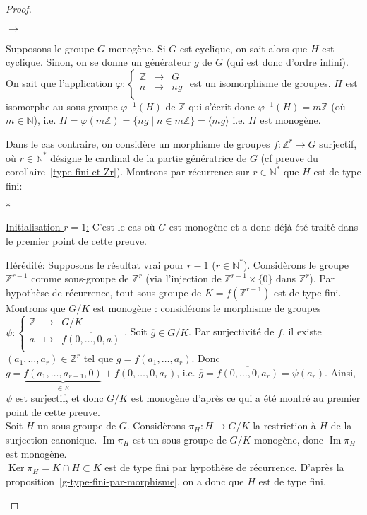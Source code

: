 \documentclass{article}
\newcommand{\Z}{\mathbb{Z}}
\newcommand{\N}{\mathbb{N}}
\newcommand{\im}{\mathop{\mathrm{Im}}\nolimits}
\renewcommand{\ker}{\mathop{\mathrm{Ker}}\nolimits}
\newenvironment{ls}{\begin{list}{$\to$}{}}{\end{list}}
\newenvironment{lls}{\begin{list}{$\ast$}{}}{\end{list}}
\theoremstyle{definition}
\theoremstyle{remark}
\newcommand{\app}[5]{#1:\left\{\begin{array}{rcl}
#2 & \longrightarrow & #3 \\
#4 & \longmapsto & #5  \\
\end{array}\right.
}
\begin{document}
\begin{proof}
\begin{ls}
\item Supposons le groupe $G$ monogène. Si $G$ est cyclique, on sait alors que $H$ est cyclique. Sinon, on se donne un générateur $g$ de $G$ (qui est donc d'ordre infini). On sait que l'application $\app{\varphi}{\Z}{G}{n}{ng}$ est un isomorphisme de groupes. $H$ est isomorphe au sous-groupe $\varphi^{-1}(H)$ de $\Z$ qui s'écrit donc $\varphi^{-1}(H)=m\Z$ (où $m \in \N$), i.e. $H=\varphi(m\Z)=\{ng \mid n \in m\Z \}=\langle mg\rangle$ i.e. $H$ est monogène. 
\item Dans le cas contraire, on considère un morphisme de groupes $f:\Z^r\to G$ surjectif, où $r \in \N^*$ désigne le cardinal de la partie génératrice de $G$ (cf preuve du corollaire~\ref{type-fini-et-Zr}). Montrons par récurrence sur $r \in \N^*$ que $H$ est de type fini:
\begin{lls}
	\item\underline{Initialisation $r=1$:} C'est le cas o\`u $G$ est monog\`ene et a donc d\'ej\`a été traité dans le premier point de cette preuve.
	\item\underline{H\'er\'edit\'e:} Supposons le résultat vrai pour $r-1$ ($r \in \N^*$). Considèrons le groupe $\Z^{r-1}$ comme sous-groupe de $\Z^r$ (via l'injection de $\Z^{r-1} \times \{0\}$ dans $\Z^{r}$). Par hypothèse de récurrence, tout sous-groupe de $K=f(\Z^{r-1})$ est de type fini. Montrons que $G/K$ est monogène : considérons le morphisme de groupes $\app{\psi}{\Z}{G/K}{a}{\overline{f(0, \ldots, 0,a)}}$. 
Soit $\overline{g} \in G/K$. Par surjectivité de $f$, il existe $(a_1, \ldots, a_r) \in \Z^r$ tel que $g=f(a_1, \ldots, a_r)$. Donc $g=\underbrace{f(a_1, \ldots, a_{r-1},0)}_{\in K}+f(0, \ldots, 0, a_r)$, i.e. $\overline{g}=\overline{f(0, \ldots, 0,a_r)}=\psi(a_r)$. Ainsi, $\psi$ est surjectif, et donc $G/K$ est monog\`ene d'apr\`es ce qui a \'et\'e montr\'e au premier point de cette preuve.\\
Soit $H$ un sous-groupe de $G$.
Considèrons $\pi_H:H\to G/K$ la restriction \`a $H$ de la surjection canonique. $\im \pi_H$ est un sous-groupe de $G/K$ monogène, donc $\im \pi_H$ est monogène. \\
$\ker \pi_H=K \cap H \subset K$ est de type fini par hypothèse de récurrence. D'après la proposition~\ref{g-type-fini-par-morphisme}, on a donc que $H$ est de type fini.
\end{lls}
\end{ls}
\end{proof}
\end{document}

